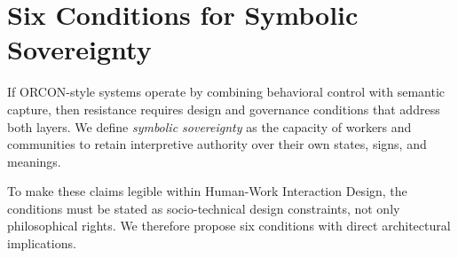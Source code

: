 \documentclass[runningheads]{llncs}
\begin{document}
\section{Six Conditions for Symbolic Sovereignty}

If ORCON-style systems operate by combining behavioral control with semantic capture, then resistance requires design and governance conditions that address both layers. We define \emph{symbolic sovereignty} as the capacity of workers and communities to retain interpretive authority over their own states, signs, and meanings.

To make these claims legible within Human-Work Interaction Design, the conditions must be stated as socio-technical design constraints, not only philosophical rights. We therefore propose six conditions with direct architectural implications.
\end{document}
